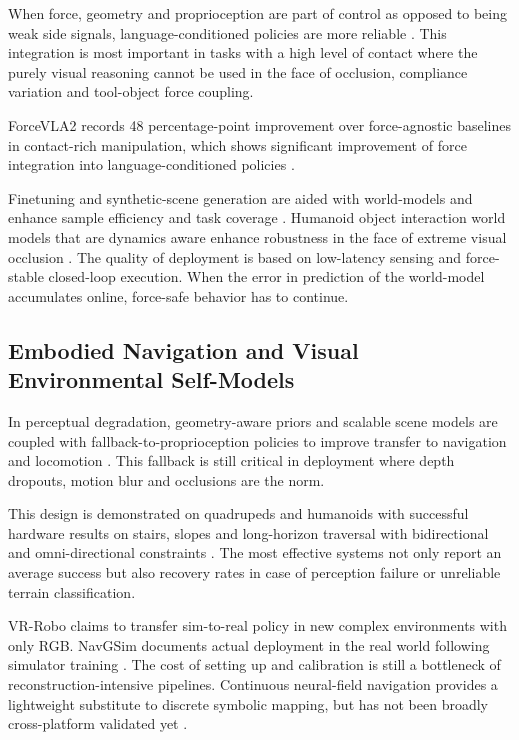 \documentclass[11pt,a4paper]{article}
\begin{document}
When force, geometry and proprioception are part of control as opposed to being weak side signals, language-conditioned policies are more reliable \cite{li2026forcevla2,tu2025sgvla}. This integration is most important in tasks with a high level of contact where the purely visual reasoning cannot be used in the face of occlusion, compliance variation and tool-object force coupling.

ForceVLA2 records 48 percentage-point improvement over force-agnostic baselines in contact-rich manipulation, which shows significant improvement of force integration into language-conditioned policies \cite{li2026forcevla2}.

Finetuning and synthetic-scene generation are aided with world-models and enhance sample efficiency and task coverage \cite{zhang2026vlambpo,he2025vdreamer}. Humanoid object interaction world models that are dynamics aware enhance robustness in the face of extreme visual occlusion \cite{li2026haic}. The quality of deployment is based on low-latency sensing and force-stable closed-loop execution. When the error in prediction of the world-model accumulates online, force-safe behavior has to continue.

\subsection{Embodied Navigation and Visual Environmental Self-Models}

In perceptual degradation, geometry-aware priors and scalable scene models are coupled with fallback-to-proprioception policies to improve transfer to navigation and locomotion \cite{zhu2025vrrobo,liu2025geoloco,liu2025navgsim,miki2022anymal}. This fallback is still critical in deployment where depth dropouts, motion blur and occlusions are the norm.

This design is demonstrated on quadrupeds and humanoids with successful hardware results on stairs, slopes and long-horizon traversal with bidirectional and omni-directional constraints \cite{zhang2026rpl,jiang2026omnidirectional}. The most effective systems not only report an average success but also recovery rates in case of perception failure or unreliable terrain classification.

VR-Robo claims to transfer sim-to-real policy in new complex environments with only RGB. NavGSim documents actual deployment in the real world following simulator training \cite{zhu2025vrrobo,liu2025navgsim}. The cost of setting up and calibration is still a bottleneck of reconstruction-intensive pipelines. Continuous neural-field navigation provides a lightweight substitute to discrete symbolic mapping, but has not been broadly cross-platform validated yet \cite{thomas2026embodied}.
\end{document}
